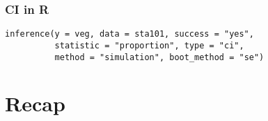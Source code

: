 \documentclass[11pt,containsverbatim,handout,xcolor=xelatex,dvipsnames,table]{beamer}
\begin{document}

\begin{frame}[fragile]
\frametitle{CI in R}

{\footnotesize
\begin{verbatim}
inference(y = veg, data = sta101, success = "yes", 
          statistic = "proportion", type = "ci", 
          method = "simulation", boot_method = "se")
\end{verbatim}
}

\end{frame}


\section{Recap}

\end{document}
